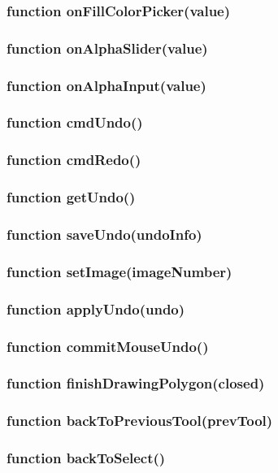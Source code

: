 \subsubsection{function onFillColorPicker(value)}
\subsubsection{function onAlphaSlider(value)}
\subsubsection{function onAlphaInput(value)}
\subsubsection{function cmdUndo()}
\subsubsection{function cmdRedo()}
\subsubsection{function getUndo()}
\subsubsection{function saveUndo(undoInfo)}
\subsubsection{function setImage(imageNumber)}
\subsubsection{function applyUndo(undo)}
\subsubsection{function commitMouseUndo()}
\subsubsection{function finishDrawingPolygon(closed)}
\subsubsection{function backToPreviousTool(prevTool)}
\subsubsection{function backToSelect()}
